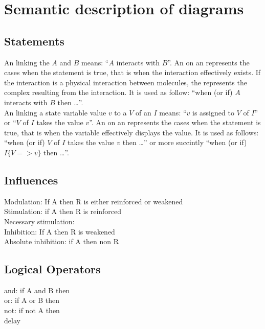 \section{Semantic description of \ER{} diagrams}

\subsection{Statements}

An  linking the  $A$ and $B$ means: ``$A$ interacts with $B$''. An  on an  represents the cases when the statement is true, that is when the interaction effectively exists. If the interaction is a physical interaction between molecules, the  represents the complex resulting from the interaction. It is used as follow: ``when (or if) $A$ interacts with $B$ then \ldots''.\\[\baselineskip]

\noindent
An  linking a state variable value $v$ to a  $V$ of an  $I$ means: ``$v$ is assigned to $V$ of $I$'' or ``$V$ of $I$ takes the value $v$''. An on an  represents the cases when the statement is true, that is when the variable effectively displays the value. It is used as follows: ``when (or if) $V$ of $I$ takes the value $v$ then \ldots'' or more succintly ``when (or if) $I\{V => v\}$ then \ldots''.\\[\baselineskip]

\subsection{Influences}

Modulation: If A then R is either reinforced or weakened\\[\baselineskip]

\noindent
Stimulation: if A then R is reinforced\\[\baselineskip]

\noindent
Necessary stimulation: \\[\baselineskip]

\noindent
Inhibition:  If A then R is weakened\\[\baselineskip]

\noindent
Absolute inhibition: if A then non R\\[\baselineskip]

\subsection{Logical Operators}

and: if A and B then\\[\baselineskip]

\noindent
or: if A or B then\\[\baselineskip]

\noindent
not: if not A then \\[\baselineskip]

\noindent
delay\\[\baselineskip]